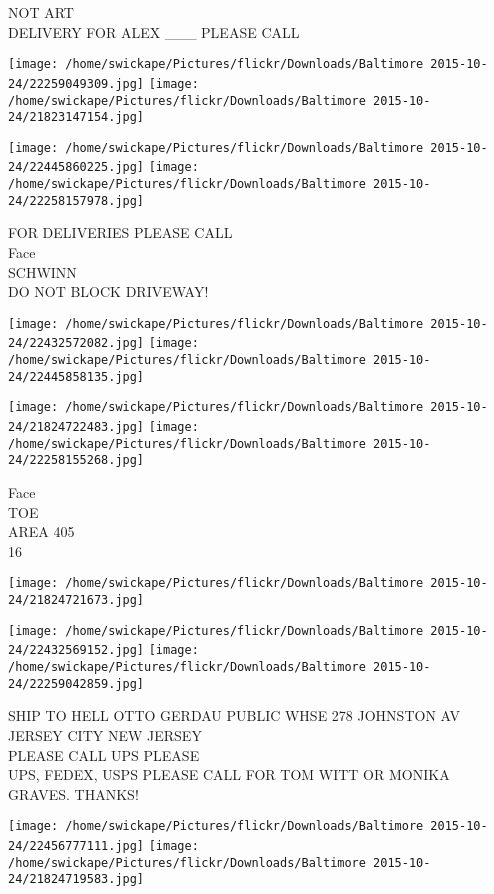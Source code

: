 \documentclass[10pt,letterpaper]{article}
\begin{document}
NOT ART\\
DELIVERY FOR ALEX \_\_\_ PLEASE CALL
\pagebreak

\texttt{[image: /home/swickape/Pictures/flickr/Downloads/Baltimore 2015-10-24/22259049309.jpg]}
\texttt{[image: /home/swickape/Pictures/flickr/Downloads/Baltimore 2015-10-24/21823147154.jpg]}

\texttt{[image: /home/swickape/Pictures/flickr/Downloads/Baltimore 2015-10-24/22445860225.jpg]}
\texttt{[image: /home/swickape/Pictures/flickr/Downloads/Baltimore 2015-10-24/22258157978.jpg]}

FOR DELIVERIES PLEASE CALL\\
Face\\
SCHWINN\\
DO NOT BLOCK DRIVEWAY!
\pagebreak

\texttt{[image: /home/swickape/Pictures/flickr/Downloads/Baltimore 2015-10-24/22432572082.jpg]}
\texttt{[image: /home/swickape/Pictures/flickr/Downloads/Baltimore 2015-10-24/22445858135.jpg]}

\texttt{[image: /home/swickape/Pictures/flickr/Downloads/Baltimore 2015-10-24/21824722483.jpg]}
\texttt{[image: /home/swickape/Pictures/flickr/Downloads/Baltimore 2015-10-24/22258155268.jpg]}

Face\\
TOE\\
AREA 405\\
16
\pagebreak

\texttt{[image: /home/swickape/Pictures/flickr/Downloads/Baltimore 2015-10-24/21824721673.jpg]}

\vspace{0.25in}
\texttt{[image: /home/swickape/Pictures/flickr/Downloads/Baltimore 2015-10-24/22432569152.jpg]}
\texttt{[image: /home/swickape/Pictures/flickr/Downloads/Baltimore 2015-10-24/22259042859.jpg]}

SHIP TO HELL OTTO GERDAU PUBLIC WHSE 278 JOHNSTON AV JERSEY CITY NEW JERSEY\\
PLEASE CALL UPS PLEASE\\
UPS, FEDEX, USPS PLEASE CALL FOR TOM WITT OR MONIKA GRAVES.  THANKS!
\pagebreak

\texttt{[image: /home/swickape/Pictures/flickr/Downloads/Baltimore 2015-10-24/22456777111.jpg]}
\texttt{[image: /home/swickape/Pictures/flickr/Downloads/Baltimore 2015-10-24/21824719583.jpg]}
\end{document}
